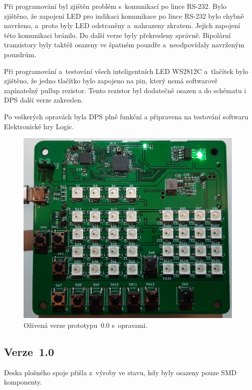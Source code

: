   Při programování byl zjištěn problém s~komunikací po lince RS-232. Bylo zjištěno, že zapojení LED pro indikaci komunikace po lince RS-232 bylo 
  chybně navrženo, a~proto byly LED odstraněny a~nahrazeny zkratem. Jejich zapojení této komunikaci bránilo. Do další verze byly překresleny správně.
  Bipolární tranzistory byly taktéž osazeny ve špatném pouzdře a~neodpovídaly navrženým pouzdrům. 
  
  Při programování a~testování všech inteligentních LED WS2812C a~tlačítek bylo zjištěno, že jedno tlačítko bylo zapojeno na pin, který 
  nemá softwarově zapínatelný pullup rezistor. Tento rezistor byl dodatečně osazen a do schématu i DPS další verze zakreslen. 
  
  Po veškerých opravách byla DPS plně funkční a připravena na testování softwaru Elektronické hry Logic.

  \begin{figure}[!h]
    \begin{center}
      \includegraphics[scale=0.1]{obrazky/Verze0_zapnuto_nabito.jpg}
    \end{center}
    \caption[Oživená verze prototypu~0.0 s~opravami]{Oživená verze prototypu~0.0 s~opravami.}
  \end{figure}

  \newpage
  \subsection{Verze~1.0}
  Deska plošného spoje přišla z~výroby ve stavu, kdy byly osazeny pouze SMD komponenty. 

